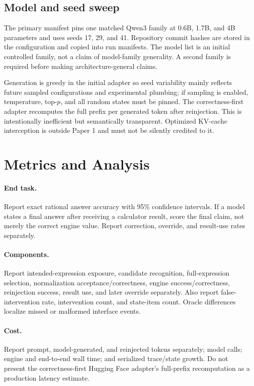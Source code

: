 \documentclass[11pt]{article}
\begin{document}
\subsection{Model and seed sweep}

The primary manifest pins one matched Qwen3 family at 0.6B, 1.7B, and 4B
parameters and uses seeds 17, 29, and 41. Repository commit hashes are stored in
the configuration and copied into run manifests. The model list is an initial
controlled family, not a claim of model-family generality. A second family is
required before making architecture-general claims.

Generation is greedy in the initial adapter so seed variability mainly reflects
future sampled configurations and experimental plumbing; if sampling is enabled,
temperature, top-$p$, and all random states must be pinned. The correctness-first
adapter recomputes the full prefix per generated token after reinjection. This is
intentionally inefficient but semantically transparent. Optimized KV-cache
interception is outside Paper 1 and must not be silently credited to it.

\section{Metrics and Analysis}

\paragraph{End task.}
Report exact rational answer accuracy with 95\% confidence intervals. If a model
states a final answer after receiving a calculator result, score the final claim,
not merely the correct engine value. Report correction, override, and result-use
rates separately.

\paragraph{Components.}
Report intended-expression exposure, candidate recognition, full-expression
selection, normalization acceptance/correctness, engine success/correctness,
reinjection success, result use, and later override separately. Also report
false-intervention rate, intervention count, and state-item count. Oracle
differences localize missed or malformed interface events.

\paragraph{Cost.}
Report prompt, model-generated, and reinjected tokens separately; model calls;
engine and end-to-end wall time; and serialized trace/state growth. Do not present
the correctness-first Hugging Face adapter's full-prefix recomputation as a
production latency estimate.
\end{document}
